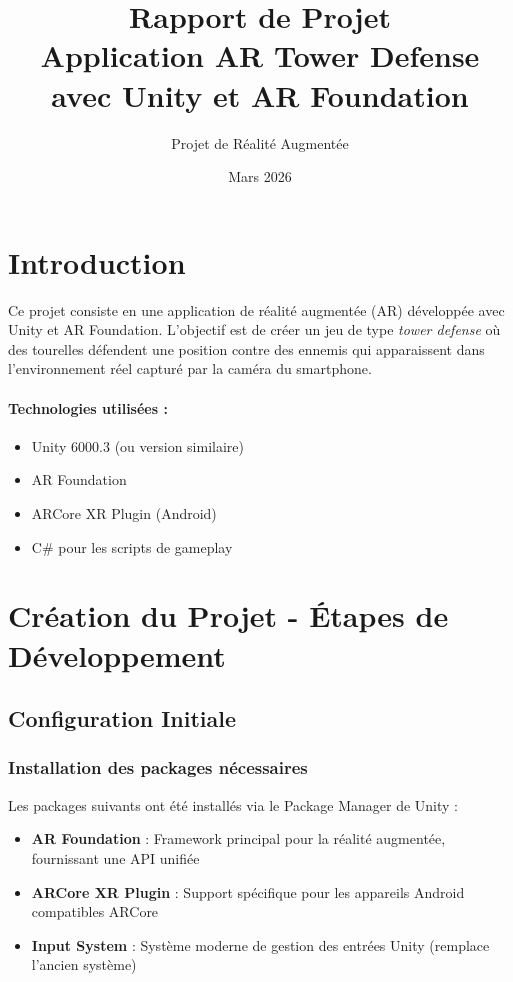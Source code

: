 \documentclass[12pt,a4paper]{article}
\title{\textbf{Rapport de Projet} \\ \Large Application AR Tower Defense \\ avec Unity et AR Foundation}
\author{Projet de Réalité Augmentée}
\date{Mars 2026}
\begin{document}
\maketitle
\thispagestyle{empty}
\newpage

\tableofcontents
\newpage

\section{Introduction}

Ce projet consiste en une application de réalité augmentée (AR) développée avec Unity et AR Foundation. L'objectif est de créer un jeu de type \textit{tower defense} où des tourelles défendent une position contre des ennemis qui apparaissent dans l'environnement réel capturé par la caméra du smartphone.

\paragraph{Technologies utilisées :}
\begin{itemize}[label=$\bullet$]
    \item Unity 6000.3 (ou version similaire)
    \item AR Foundation
    \item ARCore XR Plugin (Android)
    \item C\# pour les scripts de gameplay
\end{itemize}

\section{Création du Projet - Étapes de Développement}

\subsection{Configuration Initiale}

\subsubsection{Installation des packages nécessaires}

Les packages suivants ont été installés via le Package Manager de Unity :

\begin{itemize}
    \item \textbf{AR Foundation} : Framework principal pour la réalité augmentée, fournissant une API unifiée
    \item \textbf{ARCore XR Plugin} : Support spécifique pour les appareils Android compatibles ARCore
    \item \textbf{Input System} : Système moderne de gestion des entrées Unity (remplace l'ancien système)
\end{itemize}
\end{document}
